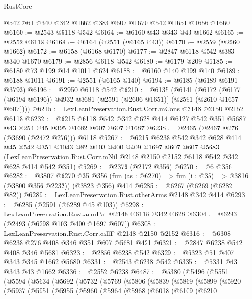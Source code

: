 \begin{lexlean}{RustCore}
\begin{coremodule}
    @542
    @61
    @340
    @342
    @1662
    @383
    @607
    @1670
    @542
    @1651
    @1656
    @1660
@6160 := @2543 @6118 @542
@6164 := @6160 @43 @343 @43 @1662
@6165 := @2552 @6118
@6168 := @6164 (@2551 (@6165 @43))
@6170 := @2559 (@2560 @1662)
@6172 := @6158 (@6168 @6170)
@6177 := @2847 @6118 @542 @383 @340 @1670
@6179 := @2856 @6118 @542
@6180 := @6179 @209
@6185 := @6180 @73 @199 @14 @1011 @624
@6188 := @6160 @140 @199 @140
@6189 := @6188 @1011
@6191 := @2551 (@6165 @140)
@6194 := @6185 (@6189 @6191 @3793)
@6196 := @2950 @6118 @542
@6210 := @6135
    (@6141
      (@6172 (@6177 (@6194 @6196)) @4932 @3681 (@2591 (@2606 @1651)) (@2591 (@2610 @1657 @607))))
@6215 := LexLeanPreservation.Rust.Corr.mCons @2148 @2150 @2152 @6118
@6232 := @6215
    @6118
    @542
    @342
    @628
    @414
    @6127
    @542
    @351
    @5687
    @43
    @254
    @45
    @395
    @1682
    @607
    @607
    @1687
@6238 := @2465 (@2467 @276 (@3690 (@2472 @276))) @6118
@6267 := @6215
    @6238
    @542
    @342
    @628
    @414
    @45
    @542
    @351
    @1043
    @82
    @103
    @400
    @409
    @1697
    @607
    @607
    @5683
    (LexLeanPreservation.Rust.Corr.mNil @2148 @2150 @2152 @6118 @542 @342 @628 @414 @542 @351)
@6269 := @2379 (@2172 @356)
@6270 := @6 @356
@6282 := @3807
    @6270
    @35
    @356
    (fun (as : @6270) => fun (i : @35) => @3816 (@3800 @356 @2232))
    (@3823 @356)
    @414
@6285 := @6267 (@6269 (@6282 @82))
@6289 := LexLeanPreservation.Rust.otherArms @2148 @342 @414
@6293 := @6285 (@2591 (@6289 @45 @103))
@6298 := LexLeanPreservation.Rust.armPat @2148 @6118 @342 @628
@6304 := @6293 (@2493 (@6298 @103 @400 @1697 @607))
@6308 := LexLeanPreservation.Rust.Corr.callF @2148 @2150 @2152
@6316 := @6308 @6238 @276 @408 @346 @351 @607 @5681 @421
@6321 := @2847 @6238 @542 @408 @346 @5681
@6323 := @2856 @6238 @542
@6329 := @6323 @61 @407 @343 @345 @1662 @5680
@6331 := @2543 @6238 @542
@6335 := @6331 @43 @343 @43 @1662
@6336 := @2552 @6238
@6487 := @5380
    (@5496
      (@5551
        (@5594
          (@5634
            (@5692
              (@5732
                (@5769
                  (@5806
                    (@5839
                      (@5869
                        (@5899
                          (@5920
                            (@5937
                              (@5951
                                (@5955
                                  (@5960
                                    (@5964
                                      (@5968
                                        (@6018
                                          (@6109
                                            (@6210

\end{coremodule}
\end{lexlean}

